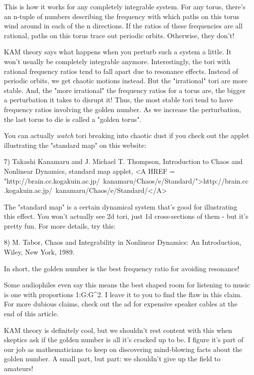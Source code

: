 This is how it works for any completely integrable system.  For any torus,
there's an n-tuple of numbers describing the frequency with which paths on 
this torus wind around in each of the n directions.  If the ratios of these 
frequencies are all rational, paths on this torus trace out periodic orbits.
Otherwise, they don't!

KAM theory says what happens when you perturb such a system a little.
It won't usually be completely integrable anymore.   Interestingly, the 
tori with rational frequency ratios tend to fall apart due to resonance 
effects.  Instead of periodic orbits, we get chaotic motions instead.   
But the "irrational" tori are more stable.  And, the "more 
irrational" the 
frequency ratios for a torus are, the bigger a perturbation it takes to 
disrupt it!  Thus, the most stable tori tend to have frequency ratios 
involving the golden number.  As we increase the perturbation, the last 
torus to die is called a "golden torus".

You can actually \emph{watch} tori breaking into chaotic dust if you check 
out 
the applet illustrating the "standard map" on this website:

7) Takashi Kanamaru and J. Michael T. Thompson, Introduction to Chaos 
and Nonlinear Dynamics, standard map applet,
<A HREF = "http://brain.cc.kogakuin.ac.jp/~kanamaru/Chaos/e/Standard/">http://brain.cc.kogakuin.ac.jp/~kanamaru/Chaos/e/Standard/</A>

The "standard map" is a certain dynamical system that's good for 
illustrating this effect.  You won't actually see 2d tori, just 
1d cross-sections of them - but it's pretty fun.  For more details, 
try this:

8) M. Tabor, Chaos and Integrability in Nonlinear Dynamics: An Introduction,
Wiley, New York, 1989. 

In short, the golden number is the best frequency ratio for avoiding
resonance!  

Some audiophiles even say this means the best shaped room for listening 
to music is one with proportions 1:G:G^{2}.  I leave it to you to find the 
flaw in this claim.   For more dubious claims, check out the ad for expensive 
speaker cables at the end of this article.

KAM theory is definitely cool, but we shouldn't rest content with this
when skeptics ask if the golden number is all it's cracked up to be.  
I figure it's part of our job as mathematicians to keep on discovering
mind-blowing facts about the golden number.  A small part, but part:
we shouldn't give up the field to amateurs!  


